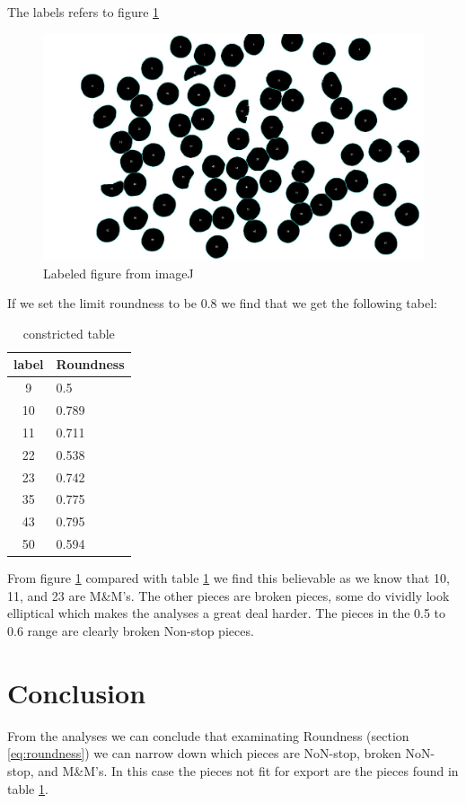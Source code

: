 \documentclass{article}
\begin{document}
The labels refers to figure \ref{fig:greypicallbingradlabel}
\begin{figure}[H]
\centering
\includegraphics[width=\linewidth]{pics/grey_pic_all_bin_grad_label}
\caption{Labeled figure from imageJ}
\label{fig:greypicallbingradlabel}
\end{figure}

If we set the limit roundness to be 0.8 we find that we get the following tabel:
\begin{table}[H]
\centering
\begin{tabular}{|c|l|}
\hline
label&Roundness\\\hline
9&0.5\\\hline
10&0.789\\\hline
11&0.711\\\hline
22&0.538\\\hline
23&0.742\\\hline
35&0.775\\\hline
43&0.795\\\hline
50&0.594\\\hline
\end{tabular}
\caption{constricted table}
\label{tab:constrcted}
\end{table}

From figure \ref{fig:greypicallbingradlabel} compared with table \ref{tab:constrcted} we find this believable as we know that 10, 11, and 23 are M\&M's. The other pieces are broken pieces, some do vividly look elliptical which makes the analyses a great deal harder. The pieces in the 0.5 to 0.6 range are clearly broken Non-stop pieces.

\section{Conclusion}

From the analyses we can conclude that examinating Roundness (section \ref{eq:roundness}) we can narrow down which pieces are NoN-stop, broken NoN-stop, and M\&M's. In this case the pieces not fit for export are the pieces found in table \ref{tab:constrcted}.

\printbibliography
\end{document}
